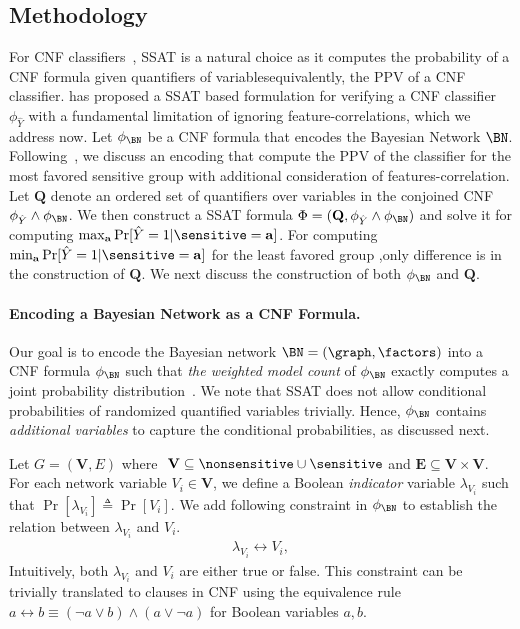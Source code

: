 \subsection{Methodology}
For CNF classifiers~\cite{GMM20}, SSAT is a natural choice as it computes the probability of a CNF formula  given quantifiers of variables\textemdash equivalently, the PPV of a CNF classifier. \cite{ghosh2020justicia} has proposed a SSAT based formulation for verifying a CNF classifier $ \phi_{\hat{Y}} $ with a fundamental limitation of ignoring feature-correlations, which we address now. Let $ \phi_\BN $ be a CNF formula that encodes the Bayesian Network $ \BN $. Following~\cite{ghosh2020justicia}, we discuss an encoding that compute the PPV of the classifier for the most favored sensitive group with additional consideration of features-correlation. Let $\mathbf{Q}$ denote an ordered set of quantifiers over variables in the conjoined CNF $ \phi_{\hat{Y}} \wedge \phi_\BN $. We then construct a SSAT formula $ \Phi =  (\mathbf{Q},  \phi_{\hat{Y}} \wedge \phi_\BN) $ and solve it for computing $ \max_{\mathbf{a}} \Pr[\hat{Y} = 1 | \sensitive = \mathbf{a}] $. For computing $ \min_{\mathbf{a}} \Pr[\hat{Y} = 1 | \sensitive = \mathbf{a}] $ for the least favored group ,only difference is in the construction of $\mathbf{Q}$. We next discuss the construction of both $ \phi_\BN $ and $\mathbf{Q}$.





\paragraph{Encoding a Bayesian Network as a CNF Formula.}\label{sec:BN_to_CNF}
Our goal is to encode the Bayesian network $ \BN = (\graph, \factors) $ into a CNF formula $ \phi_\BN $ such that \textit{the weighted model count} of $ \phi_\BN $ exactly computes a joint probability distribution~\cite{chavira2008probabilistic}.  We note that SSAT does not allow conditional probabilities of randomized quantified variables trivially. Hence, $ \phi_\BN $ contains \textit{additional variables} to capture the conditional probabilities, as discussed next.


Let  $ G = (\mathbf{V}, E) $ where $  $  $ \mathbf{V} \subseteq \nonsensitive \cup \sensitive $ and $ \mathbf{E} \subseteq \mathbf{V} \times \mathbf{V} $. 	For each network variable $ V_i \in \mathbf{V} $, we define a Boolean \textit{indicator}  variable $ \lambda_{V_i} $ such that $ \Pr[\lambda_{V_i}] \triangleq \Pr[V_i] $. We add following constraint in $ \phi_\BN $ to establish the relation between $ \lambda_{V_i} $ and $ V_i $. 
\begin{align}
	\lambda_{V_i} \leftrightarrow V_i,
	\label{eq:indicator_constraint}
\end{align}
Intuitively, both $ \lambda_{V_i} $ and $ V_i $ are either true or false. This constraint can be trivially translated to clauses in CNF using the equivalence rule $ a \leftrightarrow b\equiv (\neg a \vee b)  \wedge (a \vee \neg a) $ for Boolean variables $ a, b$.

